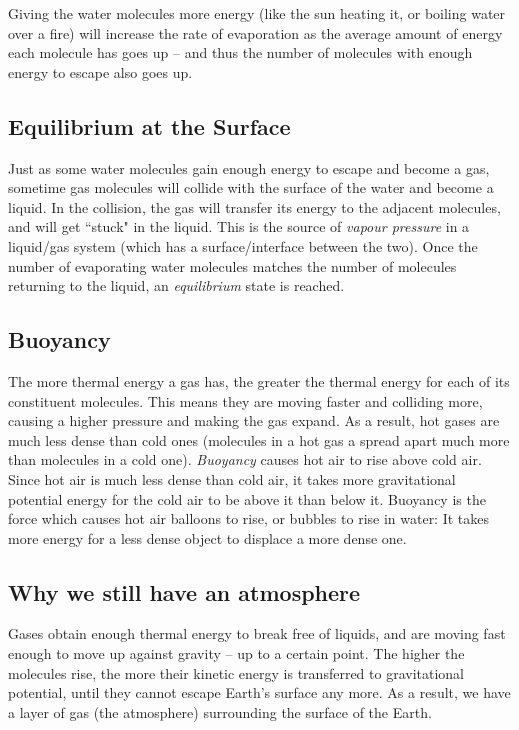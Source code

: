\documentclass[addpoints,12pt]{exam}
\begin{document}
Giving the water molecules more energy (like the sun heating it, or boiling water over a fire) will increase the rate of evaporation as the average amount of energy each molecule has goes up -- and thus the number of molecules with enough energy to escape also goes up.

\subsection{Equilibrium at the Surface}

Just as some water molecules gain enough energy to escape and become a gas, sometime gas molecules will collide with the surface of the water and become a liquid. In the collision, the gas will transfer its energy to the adjacent molecules, and will get ``stuck" in the liquid. This is the source of \textit{vapour pressure} in a liquid/gas system (which has a surface/interface between the two). Once the number of evaporating water molecules matches the number of molecules returning to the liquid, an \textit{equilibrium} state is reached. 

\subsection{Buoyancy}

The more thermal energy a gas has, the greater the thermal energy for each of its constituent molecules. This means they are moving faster and colliding more, causing a higher pressure and making the gas expand. As a result, hot gases are much less dense than cold ones (molecules in a hot gas a spread apart much more than molecules in a cold one). \textit{Buoyancy} causes hot air to rise above cold air. Since hot air is much less dense than cold air, it takes more gravitational potential energy for the cold air to be above it than below it. Buoyancy is the force which causes hot air balloons to rise, or bubbles to rise in water: It takes more energy for a less dense object to displace a more dense one.

\subsection{Why we still have an atmosphere}

Gases obtain enough thermal energy to break free of liquids, and are moving fast enough to move up against gravity -- up to a certain point. The higher the molecules rise, the more their kinetic energy is transferred to gravitational potential, until they cannot escape Earth's surface any more. As a result, we have a layer of gas (the atmosphere) surrounding the surface of the Earth.
\end{document}
